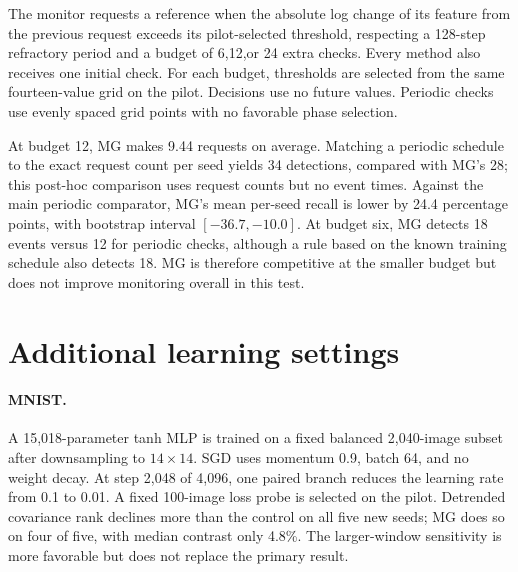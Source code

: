{The monitor requests a reference when the absolute log change of its feature from the previous request exceeds its pilot-selected threshold, respecting a 128-step refractory period and a budget of 6,12,or 24 extra checks. Every method also receives one initial check. For each budget, thresholds are selected from the same fourteen-value grid on the pilot. Decisions use no future values. Periodic checks use evenly spaced grid points with no favorable phase selection.

\begin{table}[h]
\centering\small
\caption{}

\end{table}

At budget 12, MG makes 9.44 requests on average. Matching a periodic schedule to the exact request count per seed yields 34 detections, compared with MG's 28; this post-hoc comparison uses request counts but no event times. Against the main periodic comparator, MG's mean per-seed recall is lower by 24.4 percentage points, with bootstrap interval $[-36.7,-10.0]$. At budget six, MG detects 18 events versus 12 for periodic checks, although a rule based on the known training schedule also detects 18. MG is therefore competitive at the smaller budget but does not improve monitoring overall in this test.

\section{Additional learning settings}\label{app:additional}
\paragraph{MNIST.}
A 15,018-parameter tanh MLP is trained on a fixed balanced 2,040-image subset after downsampling to $14\times14$. SGD uses momentum 0.9, batch 64, and no weight decay. At step 2,048 of 4,096, one paired branch reduces the learning rate from 0.1 to 0.01. A fixed 100-image loss probe is selected on the pilot. Detrended covariance rank declines more than the control on all five new seeds; MG does so on four of five, with median contrast only 4.8\%. The larger-window sensitivity is more favorable but does not replace the primary result.

}

